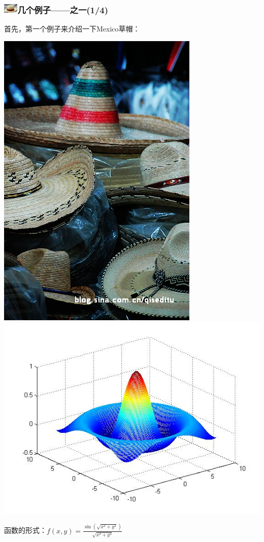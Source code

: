 \documentclass{beamer}
\begin{document}
\begin{frame}\frametitle{\includegraphics[width=7mm,height=5mm]{Images/strawhat.jpg}几个例子——之一(1/4)}
\label{Examples}
首先，第一个例子来介绍一下Mexico草帽：\\
\begin{center}
\includegraphics[width=0.2\linewidth , height=0.4\linewidth]{Images/mexicohat.jpg}
\includegraphics[width=0.4\linewidth]{Images/opthat.jpg}
\end{center}
函数的形式：$f(x,y)=\frac{\sin(\sqrt{x^2+y^2})}{\sqrt{x^2+y^2}}$
\end{frame}
\end{document}
